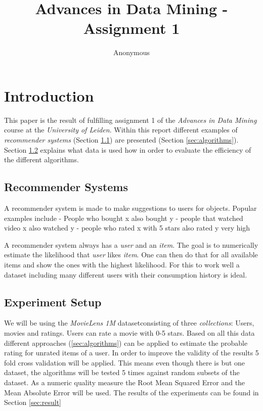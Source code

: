 \documentclass{article}[]
\begin{document}
	\title{Advances in Data Mining - Assignment 1}
	\author{Anonymous}
	\maketitle
	\lstset{
		basicstyle=\ttfamily,
		keywordstyle=\bfseries,
		language=Java,
		frame=single,
		aboveskip=11pt,
		belowskip=11pt,
		breaklines=true,
		breakatwhitespace=false,
		showspaces=false,
		showstringspaces=false,
		numbers=left,
		stepnumber=1,    
		firstnumber=1,
		numberfirstline=true
	}

\section{Introduction}
This paper is the result of fulfilling assignment 1 of the \emph{Advances in Data Mining} course at the \emph{University of Leiden}.
Within this report different examples of \emph{recommender systems} (Section \ref{sec:recommender}) are presented (Section \ref{sec:algorithms}). Section \ref{sec:setup} explains what data is used how in order to evaluate the efficiency of the different algorithms.

\subsection{Recommender Systems}
\label{sec:recommender}
A recommender system is made to make suggestions to users for objects.\cite{miller2003movielens}
Popular examples include
- People who bought x also bought y
- people that watched video x also watched y
- people who rated x with 5 stars also rated y very high

A recommender system always has a \emph{user} and an \emph{item}. The goal is to numerically estimate the likelihood that \emph{user} likes \emph{item}. One can then do that for all available items and show the ones with the highest likelihood.
For this to work well a dataset including many different users with their consumption history is ideal.

\subsection{Experiment Setup}
\label{sec:setup}
We will be using the \emph{MovieLens 1M} datasetconsisting of three \emph{collections}: Users, movies and ratings\cite{harper2016movielens}. Users can rate a movie with 0-5 stars. Based on all this data different approaches (\ref{sec:algorithms}) can be applied to estimate the probable rating for unrated items of a user.
In order to improve the validity of the results 5 fold cross validation will be applied. This means even though there is but one dataset, the algorithms will be tested 5 times against random subsets of the dataset.
As a numeric quality measure the Root Mean Squared Error and the Mean Absolute Error will be used.
The results of the experiments can be found in Section \ref{sec:result}
\end{document}
